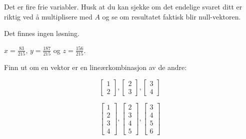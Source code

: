 \begin{losning}

\begin{punkt}
Det er fire frie variabler. Husk at du kan sjekke om det endelige svaret ditt er riktig ved å multiplisere med $A$ og se om resultatet faktisk blir null-vektoren.
\end{punkt}

\begin{punkt}
Det finnes ingen løsning.
\end{punkt}

\begin{punkt}
$x=\frac{83}{215}$, $y=\frac{187}{215}$ og $z=\frac{156}{215}$.
\end{punkt}

\end{losning}



\begin{oppgave}
Finn ut om en vektor er en lineærkombinasjon av de andre:
\begin{punkt}
$$
\begin{bmatrix}
1\\
2
\end{bmatrix},
\begin{bmatrix}
2\\
3
\end{bmatrix},
\begin{bmatrix}
3\\
4
\end{bmatrix}
$$
\end{punkt}
\begin{punkt}
	$$
	\begin{bmatrix}
	1\\
	2\\
	3\\
	4
	\end{bmatrix},
	\begin{bmatrix}
	2\\
	3\\
	4\\
	5
	\end{bmatrix},
	\begin{bmatrix}
	3\\
	4\\
	5\\
	6
	\end{bmatrix}
	$$
\end{punkt}

\end{oppgave}


